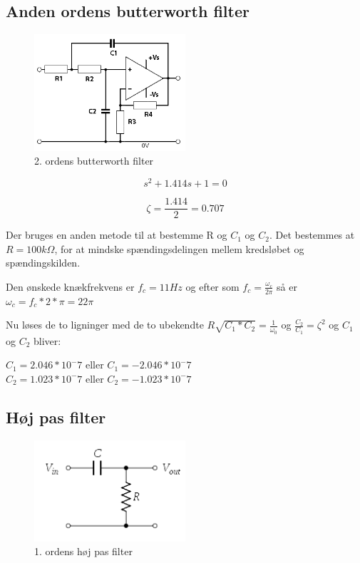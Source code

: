 \subsection{Anden ordens butterworth filter}
\begin{figure}[H]
	\centering
	\includegraphics[width = 0.5\textwidth]{billeder/2ordensButterworth.png}
	\caption{2. ordens butterworth filter}\label{fig:butterworth}
\end{figure}

\begin{equation}
	s^2 + 1.414s +1 = 0 
\end{equation}

\begin{equation}
	\zeta = \frac{1.414}{2} = 0.707
\end{equation}

Der bruges en anden metode til at bestemme R og $C_1$ og $C_2$. Det bestemmes at $R = 100k \Omega $, for at mindske spændingsdelingen mellem kredsløbet og spændingskilden.

Den ønskede knækfrekvens er $f_c = 11Hz$ og efter som $f_c = \frac{\omega_c}{2 \pi} $ så er $\omega_c = f_c * 2 * \pi = 22 \pi $

Nu løses de to ligninger med de to ubekendte $R \sqrt{C_1 * C_2} = \frac{1}{\omega_0}$ og $ \frac{C_2}{C_1} = \zeta^2$ og $C_1$ og $C_2$ bliver:

$C_1 = 2.046*10^-7$ eller $ C_1 = -2.046*10^-7$ \\
$C_2 = 1.023*10^-7$ eller $ C_2 = -1.023*10^-7$ \\

\subsection{Høj pas filter}
\begin{figure}[H]
	\centering
	\includegraphics[width = 0.5\textwidth]{billeder/HighPass.png}
	\caption{1. ordens høj pas filter}\label{fig:highpass}
\end{figure}

